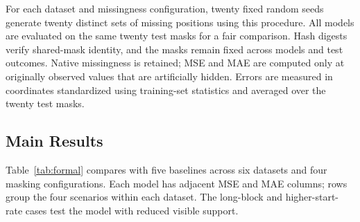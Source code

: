 For each dataset and missingness configuration, twenty fixed random seeds generate twenty distinct sets of missing positions using this procedure. All models are evaluated on the same twenty test masks for a fair comparison. Hash digests verify shared-mask identity, and the masks remain fixed across models and test outcomes. Native missingness is retained; MSE and MAE are computed only at originally observed values that are artificially hidden. Errors are measured in coordinates standardized using training-set statistics and averaged over the twenty test masks.

\subsection{Main Results}
Table~\ref{tab:formal} compares \Model{} with five baselines across six datasets and four masking configurations. Each model has adjacent MSE and MAE columns; rows group the four scenarios within each dataset. The long-block and higher-start-rate cases test the model with reduced visible support.
